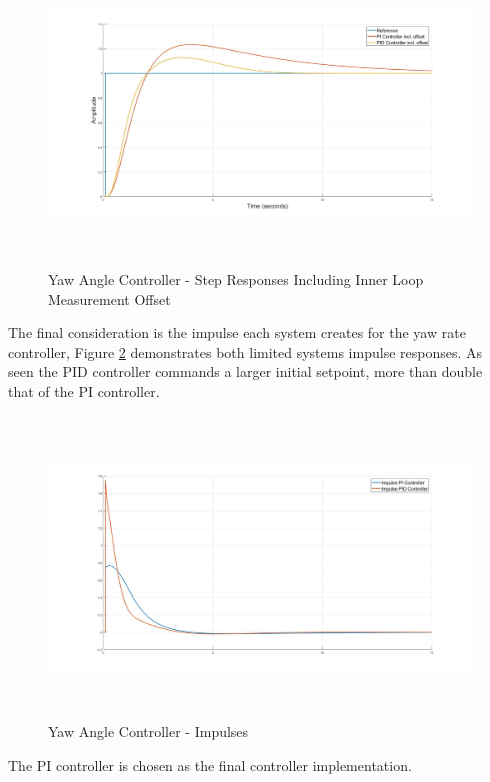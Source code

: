 		\begin{figure}[H]
			\centering
			\includegraphics[height = 8cm]{../Design/Matlab/Controllers/yaw_angle_step_both_dist.jpg}
			\caption{Yaw Angle Controller -  Step Responses Including Inner Loop Measurement Offset}
			\label{IM_YawAngleStepBoth}
		\end{figure}
		
		The final consideration is the impulse each system creates for the yaw rate controller, Figure \ref{IM_YawAngleImpulse} demonstrates both limited systems impulse responses. As seen the PID controller commands a larger initial setpoint, more than double that of the PI controller.    
		
		\begin{figure}[H]
			\centering
			\includegraphics[height = 8cm]{../Design/Matlab/Controllers/yaw_angle_impulse.jpg}
			\caption{Yaw Angle Controller -  Impulses}
			\label{IM_YawAngleImpulse}
		\end{figure}
		
		The PI controller is chosen as the final controller implementation. 
		